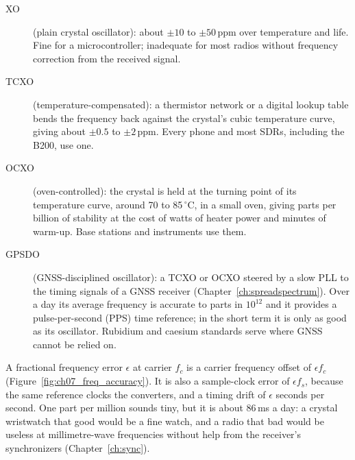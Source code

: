 \begin{description}
\item[XO] (plain crystal oscillator): about $\pm10$ to $\pm50$\,ppm over temperature and life. Fine for
a microcontroller; inadequate for most radios without frequency correction from the received signal.
\item[TCXO] (temperature-compensated): a thermistor network or a digital lookup table bends the frequency
back against the crystal's cubic temperature curve, giving about $\pm0.5$ to $\pm2$\,ppm. Every phone and
most SDRs, including the B200, use one.
\item[OCXO] (oven-controlled): the crystal is held at the turning point of its temperature curve, around
70 to 85\,$^\circ$C, in a small oven, giving parts per billion of stability at the cost of watts of heater
power and minutes of warm-up. Base stations and instruments use them.
\item[GPSDO] (GNSS-disciplined oscillator): a TCXO or OCXO steered by a slow PLL to the timing signals of
a GNSS receiver (Chapter~\ref{ch:spreadspectrum}). Over a day its average frequency is accurate to
parts in $10^{12}$ and it provides a pulse-per-second (PPS) time reference; in the short term it is only
as good as its oscillator. Rubidium and caesium standards serve where GNSS cannot be relied on.
\end{description}

A fractional frequency error $\epsilon$ at carrier $f_c$ is a carrier frequency offset of $\epsilon f_c$
(Figure~\ref{fig:ch07_freq_accuracy}). It is also a sample-clock error of $\epsilon f_s$, because the
same reference clocks the converters, and a timing drift of $\epsilon$ seconds per second. One part per
million sounds tiny, but it is about 86\,ms a day: a crystal wristwatch that good would be a fine
watch, and a radio that bad would be useless at millimetre-wave frequencies without help from the
receiver's synchronizers (Chapter~\ref{ch:sync}).


